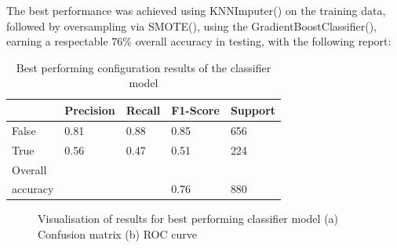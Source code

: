 \documentclass[12pt,MSc,a4paper,oneside]{muthesis}
\begin{document}
The best performance was achieved using KNNImputer(\cite{scikit-learn}) on the training data, followed by oversampling via SMOTE(\cite{JMLR:v18:16-365}), using the GradientBoostClassifier(\cite{scikit-learn}), earning a respectable 76\% overall accuracy in testing, with the following report:

\begin{table}[h]
  \caption{Best performing configuration results of the classifier model}
  \label{tab:pretrained-models}
  \begin{tabularx}{\textwidth}{|X|X|X|X|X|}
    \toprule
    {}&{Precision}&{Recall}&{F1-Score}&{Support}\\
    \midrule
    False & 0.81 & 0.88 & 0.85 & 656\\\hline
                       
    True & 0.56 & 0.47 & 0.51 & 224\\\hline
    Overall \\ accuracy &  &  & 0.76 & 880\\\hline
  \bottomrule
\end{tabularx}
\end{table}

\begin{figure}[h]
    \centering
    \caption{Visualisation of results for best performing classifier model (a) Confusion matrix (b) ROC curve}
    \label{fig:foobar}
\end{figure}
\end{document}
